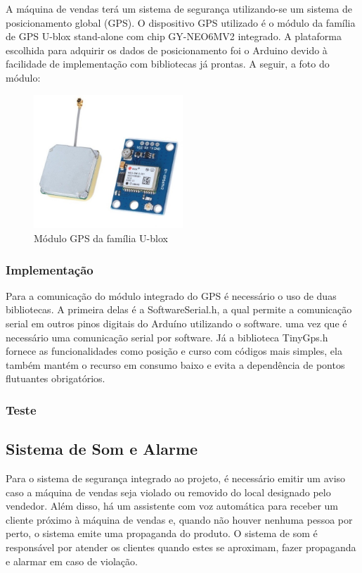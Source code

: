 A máquina de vendas terá um sistema de segurança utilizando-se um sistema de posicionamento global (GPS). O dispositivo GPS utilizado é o módulo da família de GPS U-blox stand-alone com chip GY-NEO6MV2 integrado. A plataforma escolhida para adquirir os dados de posicionamento foi o Arduino devido à facilidade de implementação com bibliotecas já prontas. A seguir, a foto do módulo:

\begin{figure}[H]
	\centering
    \includegraphics[width=0.5\textwidth]{figuras/modulo_gps}
    \caption{Módulo GPS da família U-blox}
    \label{fig:GPS}
\end{figure}

\subsubsection{Implementação}

Para a comunicação do módulo integrado do GPS é necessário o uso de duas bibliotecas. A primeira delas é a SoftwareSerial.h, a qual permite a comunicação serial em outros pinos digitais do Arduíno utilizando o software.  uma vez que é necessário uma comunicação serial por software. Já a biblioteca TinyGps.h fornece as funcionalidades como posição e curso com códigos mais simples, ela também mantém o recurso em consumo baixo e evita a dependência de pontos flutuantes obrigatórios.

\subsubsection{Teste}


\subsection{Sistema de Som e Alarme}

Para o sistema de segurança integrado ao projeto, é necessário emitir um aviso caso a máquina de vendas seja violado ou removido do local designado pelo vendedor. Além disso, há um assistente com voz automática para receber um cliente próximo à máquina de vendas e, quando não houver nenhuma pessoa por perto, o sistema emite uma propaganda do produto. O sistema de som é responsável por atender os clientes quando estes se aproximam, fazer propaganda e alarmar em caso de violação.

